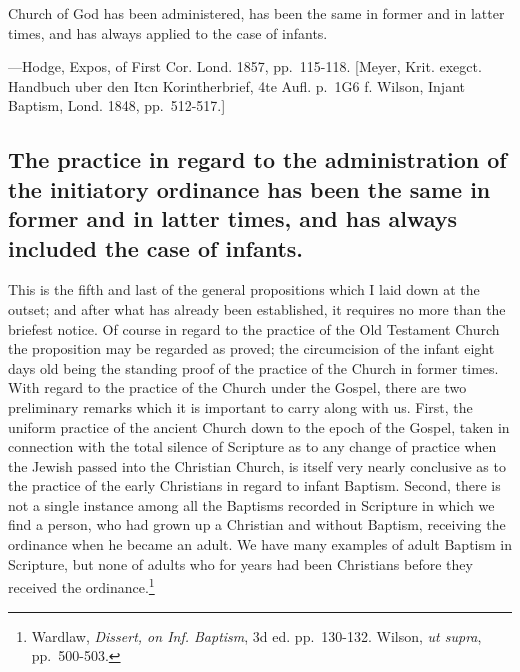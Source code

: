 \documentclass[]{book}
\begin{document}
Church of God has been administered, has been the same in former and in latter times, and has always applied to the case of infants.

---Hodge, Expos, of First Cor. Lond. 1857, pp.~115-118. {[}Meyer, Krit. exegct. Handbuch uber den Itcn Korintherbrief, 4te Aufl. p.~1G6 f. Wilson, Injant Baptism, Lond. 1848, pp.~512-517.{]}

\hypertarget{the-practice-in-regard-to-the-administration-of-the-initiatory-ordinance-has-been-the-same-in-former-and-in-latter-times-and-has-always-included-the-case-of-infants.}{%
\subsection{The practice in regard to the administration of the initiatory ordinance has been the same in former and in latter times, and has always included the case of infants.}\label{the-practice-in-regard-to-the-administration-of-the-initiatory-ordinance-has-been-the-same-in-former-and-in-latter-times-and-has-always-included-the-case-of-infants.}}

This is the fifth and last of the general propositions which I laid down at the outset; and after what has already been established, it requires no more than the briefest notice. Of course in regard to the practice of the Old Testament Church the proposition may be regarded as proved; the circumcision of the infant eight days old being the standing proof of the practice of the Church in former times. With regard to the practice of the Church under the Gospel, there are two preliminary remarks which it is important to carry along with us. First, the uniform practice of the ancient Church down to the epoch of the Gospel, taken in connection with the total silence of Scripture as to any change of practice when the Jewish passed into the Christian Church, is itself very nearly conclusive as to the practice of the early Christians in regard to infant Baptism. Second, there is not a single instance among all the Baptisms recorded in Scripture in which we find a person, who had grown up a Christian and without Baptism, receiving the ordinance when he became an adult. We have many examples of adult Baptism in Scripture, but none of adults who for years had been Christians before they received the ordinance.\footnote{Wardlaw, \emph{Dissert, on Inf. Baptism}, 3d ed. pp.~130-132. Wilson, \emph{ut supra}, pp.~500-503.}
\end{document}
